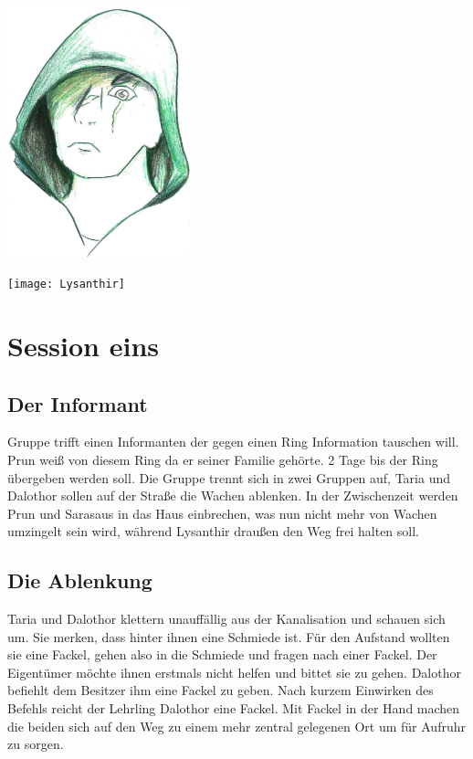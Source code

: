 \documentclass[10pt,twoside,twocolumn,openany]{book}
\begin{document}
	\includegraphics[width=0.40\textwidth]{LysanthirFace}\par
	\texttt{[image: Lysanthir]}\par\vspace{1cm}
	\newpage
	
	\chapter{Session eins}
	
	\section{Der Informant}
	
	Gruppe trifft einen Informanten der gegen einen Ring Information tauschen will.
	Prun weiß von diesem Ring da er seiner Familie gehörte.
	2 Tage bis der Ring übergeben werden soll.
	Die Gruppe trennt sich in zwei Gruppen auf, Taria und Dalothor sollen auf der Straße die Wachen ablenken. In der Zwischenzeit werden Prun und Sarasaus in das Haus einbrechen, was nun nicht mehr von Wachen umzingelt sein wird, während Lysanthir draußen den Weg frei halten soll.
	
	\section{Die Ablenkung}
	
	Taria und Dalothor klettern unauffällig aus der Kanalisation und schauen sich um. Sie merken, dass hinter ihnen eine Schmiede ist. Für den Aufstand wollten sie eine Fackel, gehen also in die Schmiede und fragen nach einer Fackel. Der Eigentümer möchte ihnen erstmals nicht helfen und bittet sie zu gehen. Dalothor befiehlt dem Besitzer ihm eine Fackel zu geben. Nach kurzem Einwirken des Befehls reicht der Lehrling Dalothor eine Fackel. Mit Fackel in der Hand machen die beiden sich auf den Weg zu einem mehr zentral gelegenen Ort um für Aufruhr zu sorgen. 
\end{document}
